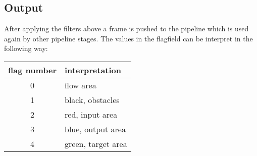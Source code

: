 \subsection{Output}
\label{sec:imgprocOutput}
\noindent After applying the filters above a frame is pushed to the pipeline which is used again by other pipeline stages. The values in the flagfield can be interpret in the following way:\newline
	
	\begin{tabular}{c|l} 
		\textbf{flag number} & \textbf{interpretation}\\
		\hline
		0 & flow area\\
		1 & black, obstacles\\
		2 & red, input area \\
		3 & blue, output area \\
		4 & green, target area
	\end{tabular}
	
	
